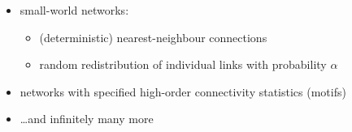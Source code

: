\documentclass{beamer}
\def\width{12.5} %
\def\height{8.5} %
\newcommand{\showgrid}{%
  \pgfsetlinewidth{0.8pt} 
  \pgfgrid[step={\pgfpoint{1cm}{1cm}}]{\pgforigin}{\pgfxy(\width,\height)}{} 
  \pgfsetlinewidth{0.1pt} 
  \pgfgrid[stepx=0.1cm,stepy=0.1cm]{\pgforigin}{\pgfxy(\width,\height)}
}
\begin{document}
\begin{frame}
{{{{{\begin{itemize}
\begin{itemize}
              \item<6-7,9-> small-world networks:
                \begin{itemize}\small
                \item (deterministic) nearest-neighbour connections
                \item random redistribution of individual links with probability $\alpha$
                \end{itemize}
              \item<7,9-> networks with specified high-order connectivity statistics 
                (motifs)
              \item<9-> \ldots and infinitely many more
              \end{itemize}
            \end{itemize}
          }}}
    }
  }
\end{frame}
\def\ttl{the balanced-random-network model {\tiny(brunel, 2000)}}
\end{document}
